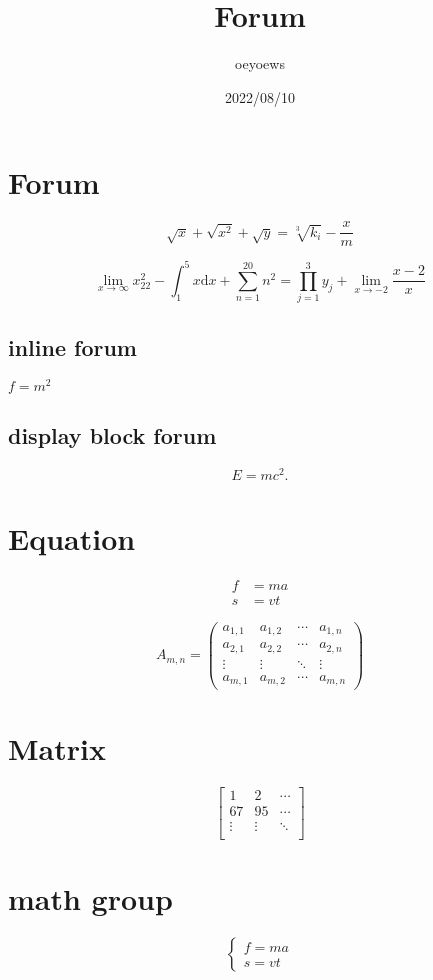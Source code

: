 \documentclass{article}
\title{Forum}
\author{oeyoews}
\date{2022/08/10}
\begin{document}
\maketitle

\section{Forum}%
\label{sec:Forum}

\[
	\sqrt{x} + \sqrt{x^2} +\sqrt{y} = \sqrt[3]{k_i} - \frac{x}{m}
\]

$$  \lim_{x \to \infty} x^2_{22} - \int_{1}^{5}x\mathrm{d}x + \sum_{n=1}^{20} n^{2} = \prod_{j=1}^{3} y_{j}  + \lim_{x \to -2} \frac{x-2}{x} $$

\subsection{inline forum}%
\label{sub:inline forum}

$f = m^2$

\subsection{display block forum}%
\label{sub:display block forum}

\[
	E = mc^2
	.\]

\section{Equation}%
\label{sec:equation}

\begin{align}
	f & = ma \\
	s & = vt
\end{align}

\begin{equation}
	A_{m,n} =
	\begin{pmatrix}
		a_{1,1} & a_{1,2} & \cdots & a_{1,n} \\
		a_{2,1} & a_{2,2} & \cdots & a_{2,n} \\
		\vdots  & \vdots  & \ddots & \vdots  \\
		a_{m,1} & a_{m,2} & \cdots & a_{m,n}
	\end{pmatrix}
\end{equation}

\section{Matrix}%
\label{sec:matrix}

$$\begin{bmatrix}
		1      & 2      & \cdots \\
		67     & 95     & \cdots \\
		\vdots & \vdots & \ddots \\
	\end{bmatrix}$$

\section{math group}%
\label{sec:math}

\begin{equation}
	\left\{
	\begin{aligned}
		f = ma \\
		s = vt
	\end{aligned}
\right.
\end{equation}
\end{document}
